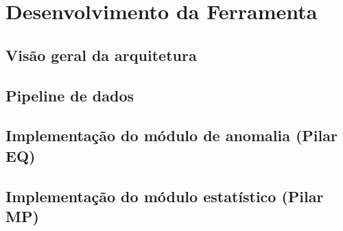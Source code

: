 \chapter{Desenvolvimento da Ferramenta}
\label{cap:desenvolvimento}

%


\section{Visão geral da arquitetura}
\label{sec:arquitetura}



\section{Pipeline de dados}
\label{sec:pipeline}



\section{Implementação do módulo de anomalia (Pilar EQ)}
\label{sec:impl_eq}



\section{Implementação do módulo estatístico (Pilar MP)}
\label{sec:impl_mp}

